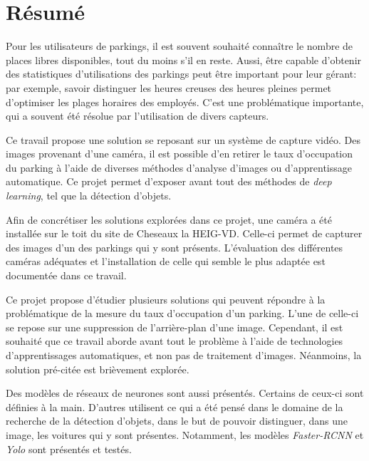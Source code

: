 \chapter{Résumé}

Pour les utilisateurs de parkings, il est souvent souhaité connaître le nombre de places libres disponibles, tout du moins s'il en reste. Aussi, être capable d'obtenir des statistiques d'utilisations des parkings peut être important pour leur gérant: par exemple, savoir distinguer les heures creuses des heures pleines permet d'optimiser les plages horaires des employés. C'est une problématique importante, qui a souvent été résolue par l'utilisation de divers capteurs. 

Ce travail propose une solution se reposant sur un système de capture vidéo. Des images provenant d'une caméra, il est possible d'en retirer le taux d'occupation du parking à l'aide de diverses méthodes d'analyse d'images ou d'apprentissage automatique. Ce projet permet d'exposer avant tout des méthodes de \textit{deep learning}, tel que la détection d'objets. 

Afin de concrétiser les solutions explorées dans ce projet, une caméra a été  installée sur le toit du site de Cheseaux la HEIG-VD. Celle-ci permet de capturer des images d'un des parkings qui y sont présents. L'évaluation des différentes caméras adéquates et l'installation de celle qui semble le plus adaptée est documentée dans ce travail. 

Ce projet propose d'étudier plusieurs solutions qui peuvent répondre à la problématique de la mesure du taux d'occupation d'un parking. L'une de celle-ci se repose sur une suppression de l'arrière-plan d'une image. Cependant, il est souhaité que ce travail aborde avant tout le problème à l'aide de technologies d'apprentissages automatiques, et non pas de traitement d'images. Néanmoins, la solution pré-citée est brièvement explorée.

Des modèles de réseaux de neurones sont aussi présentés. Certains de ceux-ci sont définies à la main. D'autres utilisent ce qui a été pensé dans le domaine de la recherche de la détection d'objets, dans le but de pouvoir distinguer, dans une image, les voitures qui y sont présentes. Notamment, les modèles \textit{Faster-RCNN} et \textit{Yolo} sont présentés et testés.
